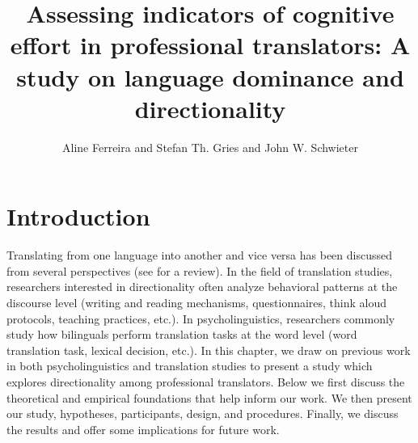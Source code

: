 \documentclass[output=paper]{langscibook}
\author{Aline Ferreira\affiliation{University of California, Santa Barbara} and Stefan Th. Gries\affiliation{University of California, Santa Barbara; Justus Liebig University Giessen} and  John W. Schwieter\affiliation{Wilfrid Laurier University}}
\title[Assessing indicators of cognitive effort in professional translators]{Assessing indicators of cognitive effort in professional translators: A study on language dominance and directionality}
\begin{document}
\renewcommand{\lsChapterFooterSize}{\scriptsize}
\maketitle

\section{Introduction}
Translating from one language into another and vice versa has been discussed from several perspectives (see \citealt{ferreira2017directionality} for a review). In the field of translation studies, researchers interested in directionality often analyze behavioral patterns at the discourse level (writing and reading mechanisms, questionnaires, think aloud protocols, teaching practices, etc.). In psycholinguistics, researchers commonly study how bilinguals perform translation tasks at the word level (word translation task, lexical decision, etc.). In this chapter, we draw on previous work in both psycholinguistics and translation studies to present a study which explores directionality among professional translators. Below we first discuss the theoretical and empirical foundations that help inform our work. We then present our study, hypotheses, participants, design, and procedures. Finally, we discuss the results and offer some implications for future work.
 
\end{document}
